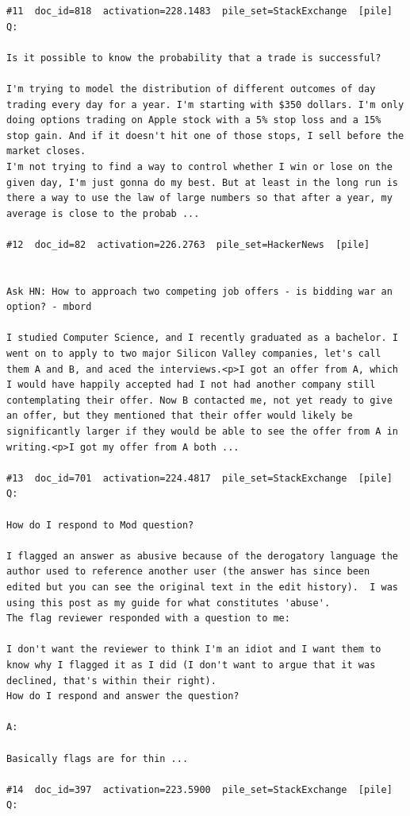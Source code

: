 \begin{verbatim}
#11  doc_id=818  activation=228.1483  pile_set=StackExchange  [pile]
Q:

Is it possible to know the probability that a trade is successful?

I'm trying to model the distribution of different outcomes of day trading every day for a year. I'm starting with $350 dollars. I'm only doing options trading on Apple stock with a 5% stop loss and a 15% stop gain. And if it doesn't hit one of those stops, I sell before the market closes.
I'm not trying to find a way to control whether I win or lose on the given day, I'm just gonna do my best. But at least in the long run is there a way to use the law of large numbers so that after a year, my average is close to the probab ...

#12  doc_id=82  activation=226.2763  pile_set=HackerNews  [pile]


Ask HN: How to approach two competing job offers - is bidding war an option? - mbord

I studied Computer Science, and I recently graduated as a bachelor. I went on to apply to two major Silicon Valley companies, let's call them A and B, and aced the interviews.<p>I got an offer from A, which I would have happily accepted had I not had another company still contemplating their offer. Now B contacted me, not yet ready to give an offer, but they mentioned that their offer would likely be significantly larger if they would be able to see the offer from A in writing.<p>I got my offer from A both ...

#13  doc_id=701  activation=224.4817  pile_set=StackExchange  [pile]
Q:

How do I respond to Mod question?

I flagged an answer as abusive because of the derogatory language the author used to reference another user (the answer has since been edited but you can see the original text in the edit history).  I was using this post as my guide for what constitutes 'abuse'.
The flag reviewer responded with a question to me:

I don't want the reviewer to think I'm an idiot and I want them to know why I flagged it as I did (I don't want to argue that it was declined, that's within their right).
How do I respond and answer the question?

A:

Basically flags are for thin ...

#14  doc_id=397  activation=223.5900  pile_set=StackExchange  [pile]
Q:


\end{verbatim}
